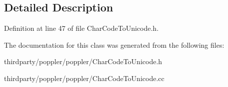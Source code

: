 \subsection{Detailed Description}


Definition at line 47 of file Char\+Code\+To\+Unicode.\+h.



The documentation for this class was generated from the following files\+:\begin{DoxyCompactItemize}
\item 
thirdparty/poppler/poppler/Char\+Code\+To\+Unicode.\+h\item 
thirdparty/poppler/poppler/Char\+Code\+To\+Unicode.\+cc\end{DoxyCompactItemize}
